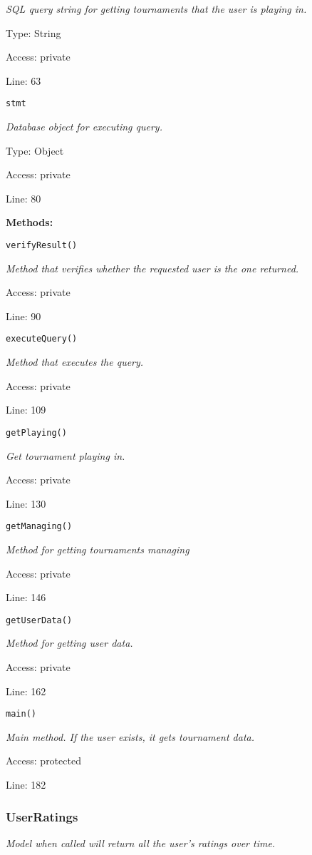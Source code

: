{\scriptsize
\textit{SQL query string for getting tournaments that the user is playing in.}

Type: String

Access: private

Line: 63

}
\texttt{stmt}

{\scriptsize
\textit{Database object for executing query.}

Type: Object

Access: private

Line: 80

}
\textbf{Methods:}

\texttt{verifyResult()}

{\scriptsize
\textit{Method that verifies whether the requested user is the one returned.}

Access: private

Line: 90

}

\texttt{executeQuery()}

{\scriptsize
\textit{Method that executes the query.}

Access: private

Line: 109

}

\texttt{getPlaying()}

{\scriptsize
\textit{Get tournament playing in.}

Access: private

Line: 130

}

\texttt{getManaging()}

{\scriptsize
\textit{Method for getting tournaments managing}

Access: private

Line: 146

}

\texttt{getUserData()}

{\scriptsize
\textit{Method for getting user data.}

Access: private

Line: 162

}

\texttt{main()}

{\scriptsize
\textit{Main method.
If the user exists, it gets tournament data.}

Access: protected

Line: 182

}

\subsubsection{UserRatings}\label{UserRatings.php.doc}
\textit{Model when called will return all the user's ratings over time.}

